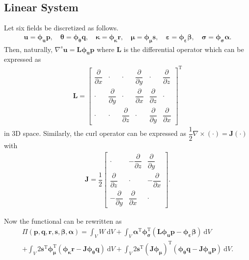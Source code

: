\documentclass[3p,sort&compress,11pt,fleqn]{elsarticle}
\newcommand*{\mT}{\mathrm{T}}
\newcommand*{\md}[1]{\mathrm{d}#1}
\newcommand*{\pfrac}[2]{\dfrac{\partial#1}{\partial#2}}
\begin{document}
\subsection{Linear System}
Let six fields be discretized as follows.
\begin{gather}
\mathbold{u}=\mathbold{\phi}_\mathbold{u}\mathbold{p},\quad
\mathbold{\theta}=\mathbold{\phi}_\mathbold{\theta}\mathbold{q},\quad
\mathbold{\kappa}=\mathbold{\phi}_\mathbold{\kappa}\mathbold{r},\quad
\mathbold{\mu}=\mathbold{\phi}_\mathbold{\mu}\mathbold{s},\quad
\mathbold{\varepsilon}=\mathbold{\phi}_\mathbold{\varepsilon}\mathbold{\beta},\quad
\mathbold{\sigma}=\mathbold{\phi}_\mathbold{\sigma}\mathbold{\alpha}.
\end{gather}
Then, naturally, $\nabla^s\mathbold{u}=\mathbold{L}\mathbold{\phi}_\mathbold{u}\mathbold{p}$ where $\mathbold{L}$ is the differential operator which can be expressed as
\begin{gather}
\mathbold{L}=\begin{bmatrix}
\pfrac{}{x}&\cdot&\cdot&\pfrac{}{y}&\cdot&\pfrac{}{z}\\[4mm]
\cdot&\pfrac{}{y}&\cdot&\pfrac{}{x}&\pfrac{}{z}&\cdot\\[4mm]
\cdot&\cdot&\pfrac{}{z}&\cdot&\pfrac{}{y}&\pfrac{}{x}
\end{bmatrix}^\mT
\end{gather}
in 3D space. Similarly, the curl operator can be expressed as $\dfrac{1}{2}\nabla\times\left(\cdot\right)=\mathbold{J}\left(\cdot\right)$ with
\begin{gather}
\mathbold{J}=\dfrac{1}{2}\begin{bmatrix}
\cdot&-\pfrac{}{z}&\pfrac{}{y}\\[4mm]
\pfrac{}{z}&\cdot&-\pfrac{}{x}\\[4mm]
-\pfrac{}{y}&\pfrac{}{x}&\cdot
\end{bmatrix}.
\end{gather}

Now the functional can be rewritten as
\begin{multline}\label{eq:functional_new}
\varPi\left(\mathbold{p},\mathbold{q},\mathbold{r},\mathbold{s},\mathbold{\beta},\mathbold{\alpha}\right)=\int_VW~\md{V}
+\int_V\mathbold{\alpha}^\mT\mathbold{\phi}_\mathbold{\sigma}^\mT\left(\mathbold{L}\mathbold{\phi}_\mathbold{u}\mathbold{p}-\mathbold{\phi}_\mathbold{\varepsilon}\mathbold{\beta}\right)~\md{V}\\
+\int_V2\mathbold{s}^\mT\mathbold{\phi}_\mathbold{\mu}^\mT\left(\mathbold{\phi}_\mathbold{\kappa}\mathbold{r}-\mathbold{J}\mathbold{\phi}_\mathbold{\theta}\mathbold{q}\right)~\md{V}
+\int_V2\mathbold{s}^\mT\left(\mathbold{J}\mathbold{\phi}_\mathbold{\mu}\right)^\mT\left(\mathbold{\phi}_\mathbold{\theta}\mathbold{q}-\mathbold{J}\mathbold{\phi}_\mathbold{u}\mathbold{p}\right)~\md{V}.
\end{multline}
\end{document}
